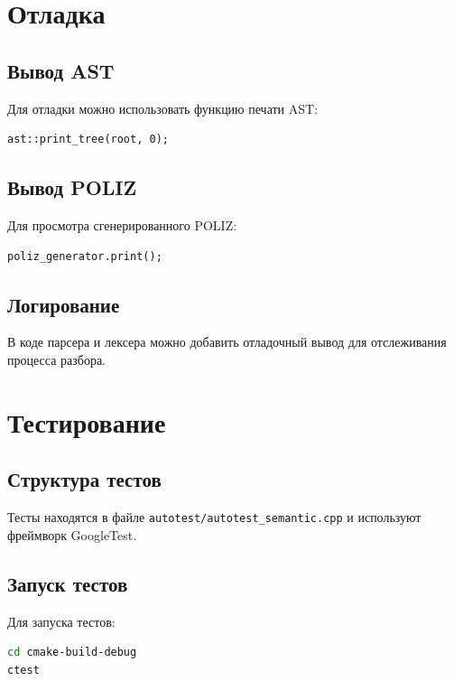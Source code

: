 \documentclass[12pt,a4paper]{article}
\begin{document}
\section{Отладка}

\subsection{Вывод AST}

Для отладки можно использовать функцию печати AST:

\begin{lstlisting}
ast::print_tree(root, 0);
\end{lstlisting}

\subsection{Вывод POLIZ}

Для просмотра сгенерированного POLIZ:

\begin{lstlisting}
poliz_generator.print();
\end{lstlisting}

\subsection{Логирование}

В коде парсера и лексера можно добавить отладочный вывод для отслеживания процесса разбора.

\section{Тестирование}

\subsection{Структура тестов}

Тесты находятся в файле \texttt{autotest/autotest\_semantic.cpp} и используют фреймворк GoogleTest.

\subsection{Запуск тестов}

Для запуска тестов:

\begin{lstlisting}[language=bash]
cd cmake-build-debug
ctest
\end{lstlisting}
\end{document}
